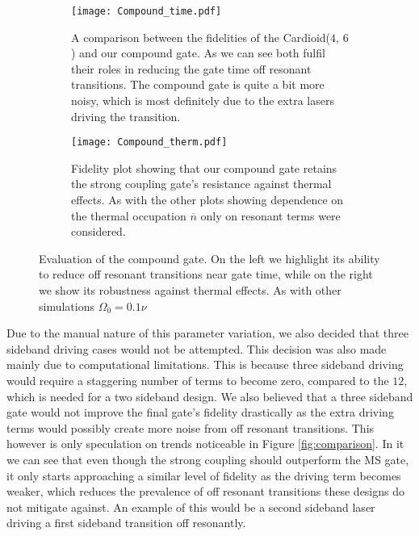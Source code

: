 \documentclass[12pt,twoside]{report}
\begin{document}
\begin{figure}[b!]
	\centering
	\begin{subfigure}[t]{0.475\textwidth}
		\centering
		\texttt{[image: Compound\_time.pdf]}
		\caption{A comparison between the fidelities of the Cardioid($4$, $6$) and our compound gate. As we can see both fulfil their roles in reducing the gate time off resonant transitions. The compound gate is quite a bit more noisy, which is most definitely due to the extra lasers driving the transition.}
		\label{fig:compound:time}
	\end{subfigure}
	\hfill
	\begin{subfigure}[t]{0.475\textwidth}
		\centering
		\texttt{[image: Compound\_therm.pdf]}
		\caption{Fidelity plot showing that our compound gate retains the strong coupling gate's resistance against thermal effects. As with the other plots showing dependence on the thermal occupation $\overline{n}$ only on resonant terms were considered.}
		\label{fig:compound:therm}
	\end{subfigure}
	\caption[Cardioid gate comparison]{Evaluation of the compound gate. On the left we highlight its ability to reduce off resonant transitions near gate time, while on the right we show its robustness against thermal effects. As with other simulations $\Omega_0=0.1\nu$}
	\label{fig:compound}
\end{figure}

Due to the manual nature of this parameter variation, we also decided that three sideband driving cases would not be attempted. This decision was also made mainly due to computational limitations. This is because three sideband driving would require a staggering number of terms to become zero, compared to the $12$, which is needed for a two sideband design. We also believed that a three sideband gate would not improve the final gate's fidelity drastically as the extra driving terms would possibly create more noise from off resonant transitions. This however is only speculation on trends noticeable in Figure \ref{fig:comparison}. In it we can see that even though the strong coupling should outperform the MS gate, it only starts approaching a similar level of fidelity as the driving term becomes weaker, which reduces the prevalence of off resonant transitions these designs do not mitigate against. An example of this would be a second sideband laser driving a first sideband transition off resonantly.
\end{document}
